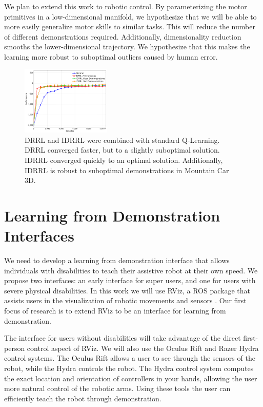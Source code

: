 \documentclass[letterpaper]{article}
\begin{document}
We plan to extend this work to robotic control. By parameterizing the motor primitives in a low-dimensional manifold, we hypothesize that we will be able to more easily generalize motor skills to similar tasks.  This will reduce the number of different demonstrations required. Additionally, dimensionality reduction smooths the lower-dimensional trajectory. We hypothesize that this makes the learning more robust to suboptimal outliers caused by human error. 

\begin{figure}[]
  \centering
      \includegraphics[width=0.38\textwidth]{IDRRL_DC}
  \caption{DRRL and IDRRL were combined with standard Q-Learning. DRRL converged faster, but to a slightly suboptimal solution. IDRRL converged quickly to an optimal solution. Additionally, IDRRL is robust to suboptimal demonstrations in Mountain Car 3D.}
  \label{fig:IDRRL_3DMountainCar}
\end{figure}

\section{Learning from Demonstration Interfaces}
\label{Learning by Demonstration}

We need to develop a learning from demonstration interface that allows individuals with disabilities to teach their assistive robot at their own speed. We propose two interfaces: an early interface for super users, and one for users with severe physical disabilities. In this work we will use RViz, a ROS package that assists users in the visualization of robotic movements and sensors \cite{quigley:ros}.  Our first focus of research is to extend RViz to be an interface for learning from demonstration. 

The interface for users without disabilities will take advantage of the direct first-person control aspect of RViz.  We will also use the Oculus Rift and Razer Hydra control systems. The Oculus Rift allows a user to see through the sensors of the robot, while the Hydra controls the robot. The Hydra control system computes the exact location and orientation of controllers in your hands, allowing the user more natural control of the robotic arms. Using these tools the user can efficiently teach the robot through demonstration.
\end{document}

